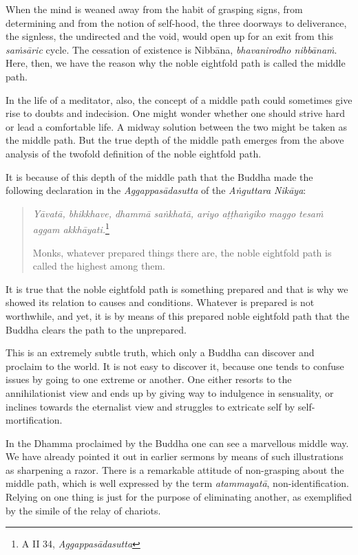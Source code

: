 When the mind is weaned away from the habit of grasping signs, from determining and from the notion of self-hood, the three doorways to deliverance, the signless, the undirected and the void, would open up for an exit from this \emph{saṁsāric} cycle. The cessation of existence is Nibbāna, \emph{bhavanirodho nibbānaṁ}. Here, then, we have the reason why the noble eightfold path is called the middle path.

In the life of a meditator, also, the concept of a middle path could sometimes give rise to doubts and indecision. One might wonder whether one should strive hard or lead a comfortable life. A midway solution between the two might be taken as the middle path. But the true depth of the middle path emerges from the above analysis of the twofold definition of the noble eightfold path.

It is because of this depth of the middle path that the Buddha made the following declaration in the \emph{Aggappasādasutta} of the \emph{Aṅguttara Nikāya}:

\begin{quote}
\emph{Yāvatā, bhikkhave, dhammā saṅkhatā, ariyo aṭṭhaṅgiko maggo tesaṁ aggam akkhāyati.}\footnote{A II 34, \emph{Aggappasādasutta}}

Monks, whatever prepared things there are, the noble eightfold path is called the highest among them.
\end{quote}

It is true that the noble eightfold path is something prepared and that is why we showed its relation to causes and conditions. Whatever is prepared is not worthwhile, and yet, it is by means of this prepared noble eightfold path that the Buddha clears the path to the unprepared.

This is an extremely subtle truth, which only a Buddha can discover and proclaim to the world. It is not easy to discover it, because one tends to confuse issues by going to one extreme or another. One either resorts to the annihilationist view and ends up by giving way to indulgence in sensuality, or inclines towards the eternalist view and struggles to extricate self by self-mortification.

\enlargethispage{\baselineskip}

In the Dhamma proclaimed by the Buddha one can see a marvellous middle way. We have already pointed it out in earlier sermons by means of such illustrations as sharpening a razor. There is a remarkable attitude of non-grasping about the middle path, which is well expressed by the term \emph{atammayatā}, non-identification. Relying on one thing is just for the purpose of eliminating another, as exemplified by the simile of the relay of chariots.

